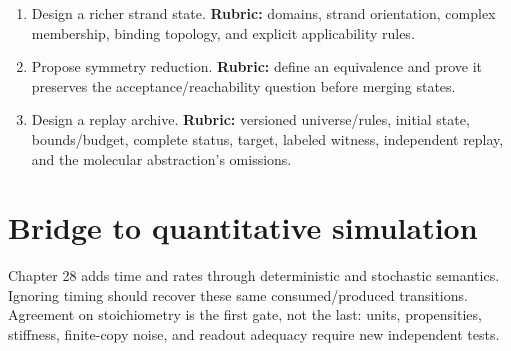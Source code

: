 \begin{enumerate}
is a separate predicate.
\item Design a richer strand state. \textbf{Rubric:} domains, strand orientation,
complex membership, binding topology, and explicit applicability rules.
\item Propose symmetry reduction. \textbf{Rubric:} define an equivalence and prove
it preserves the acceptance/reachability question before merging states.
\item Design a replay archive. \textbf{Rubric:} versioned universe/rules, initial
state, bounds/budget, complete status, target, labeled witness, independent replay,
and the molecular abstraction's omissions.
\end{enumerate}

\section{Bridge to quantitative simulation}
Chapter 28 adds time and rates through deterministic and stochastic semantics.
Ignoring timing should recover these same consumed/produced transitions. Agreement
on stoichiometry is the first gate, not the last: units, propensities, stiffness,
finite-copy noise, and readout adequacy require new independent tests.
